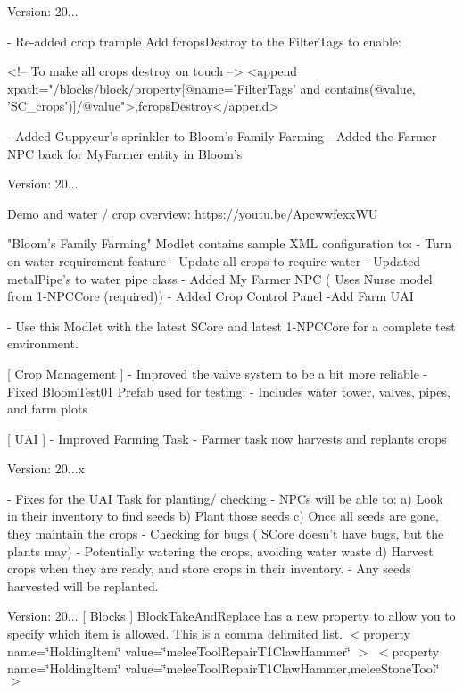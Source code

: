 Version\+: 20... \begin{DoxyVerb}[ Blocks ]
    - Re-added crop trample
        Add  fcropsDestroy to the FilterTags to enable:

        <!-- To make all crops destroy on touch -->
         <append xpath="/blocks/block/property[@name='FilterTags' and contains(@value, 'SC_crops')]/@value">,fcropsDestroy</append>

    - Added Guppycur's sprinkler to Bloom's Family Farming
    - Added the Farmer NPC back for MyFarmer entity in Bloom's
\end{DoxyVerb}
 Version\+: 20... \begin{DoxyVerb}Demo and water / crop overview: https://youtu.be/ApcwwfexxWU

"Bloom's Family Farming" Modlet contains sample XML configuration to:
    - Turn on water requirement feature
    - Update all crops to require water
    - Updated metalPipe's to water pipe class
    - Added My Farmer NPC ( Uses Nurse model from 1-NPCCore (required))
    - Added Crop Control Panel
    -Add Farm UAI

    - Use this Modlet with the latest SCore and latest 1-NPCCore for a complete test environment.

[ Crop Management ]
    - Improved the valve system to be a bit more reliable
    - Fixed BloomTest01 Prefab used for testing: 
        - Includes water tower, valves, pipes, and farm plots

[ UAI ]
    - Improved Farming Task
        - Farmer task now harvests and replants crops
\end{DoxyVerb}
 Version\+: 20...\+x \begin{DoxyVerb}
    - Fixes for the UAI Task for planting/ checking
    - NPCs will be able to:
        a) Look in their inventory to find seeds
        b) Plant those seeds
        c) Once all seeds are gone, they maintain the crops
            - Checking for bugs ( SCore doesn't have bugs, but the plants may)
            - Potentially watering the crops, avoiding water waste
        d) Harvest crops when they are ready, and store crops in their inventory.
            - Any seeds harvested will be replanted.
\end{DoxyVerb}
 Version\+: 20... \mbox{[} Blocks \mbox{]} \mbox{\hyperlink{class_block_take_and_replace}{Block\+Take\+And\+Replace}} has a new property to allow you to specify which item is allowed. This is a comma delimited list. $<$property name=\char`\"{}\+Holding\+Item\char`\"{} value=\char`\"{}melee\+Tool\+Repair\+T1\+Claw\+Hammer\char`\"{} $>$ $<$property name=\char`\"{}\+Holding\+Item\char`\"{} value=\char`\"{}melee\+Tool\+Repair\+T1\+Claw\+Hammer,melee\+Stone\+Tool\char`\"{} $>$


